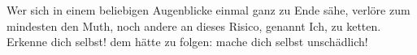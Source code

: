 Wer sich in einem beliebigen Augenblicke einmal ganz zu Ende sähe, verlöre zum mindesten den Muth, noch andere an dieses Risico, genannt Ich, zu ketten. Erkenne dich selbst! dem hätte zu folgen: mache dich selbst unschädlich!
\par

